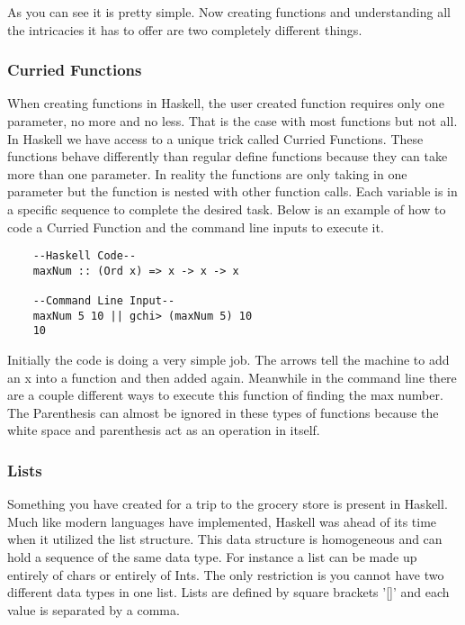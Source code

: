 \documentclass{article}
\begin{document}
    \medskip
    As you can see it is pretty simple. Now creating functions and understanding all the intricacies it has to offer are two completely different things. 
    
    \subsubsection{Curried Functions}
    When creating functions in Haskell, the user created function requires only one parameter, no more and no less. That is the case with most functions but not all. In Haskell we have access to a unique trick called Curried Functions. These functions behave differently than regular define functions because they can take more than one parameter. In reality the functions are only taking in one parameter but the function is nested with other function calls. Each variable is in a specific sequence to complete the desired task. Below is an example of how to code a Curried Function and the command line inputs to execute it. 
    
    \begin{lstlisting}
    --Haskell Code--
    maxNum :: (Ord x) => x -> x -> x 
    
    --Command Line Input--
    maxNum 5 10 || gchi> (maxNum 5) 10
    10
    \end{lstlisting}
    
    Initially the code is doing a very simple job. The arrows tell the machine to add an x into a function and then added again. Meanwhile in the command line there are a couple different ways to execute this function of finding the max number. The Parenthesis can almost be ignored in these types of functions because the white space and parenthesis act as an operation in itself.
    
    \subsubsection{Lists}
    Something you have created for a trip to the grocery store is present in Haskell. Much like modern languages have implemented, Haskell was ahead of its time when it utilized the list structure. This data structure is homogeneous and can hold a sequence of the same data type. For instance a list can be made up entirely of chars or entirely of Ints. The only restriction is you cannot have two different data types in one list. Lists are defined by square brackets '[]' and each value is separated by a comma. 
    
\end{document}
